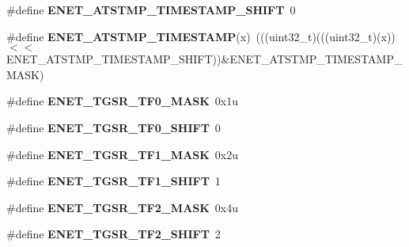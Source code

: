 \begin{DoxyCompactItemize}
\item 
\#define {\bfseries E\+N\+E\+T\+\_\+\+A\+T\+S\+T\+M\+P\+\_\+\+T\+I\+M\+E\+S\+T\+A\+M\+P\+\_\+\+S\+H\+I\+FT}~0\hypertarget{group__ENET__Register__Masks_ga32c08f5d3821f0f0ff1f40b4ec0de035}{}\label{group__ENET__Register__Masks_ga32c08f5d3821f0f0ff1f40b4ec0de035}

\item 
\#define {\bfseries E\+N\+E\+T\+\_\+\+A\+T\+S\+T\+M\+P\+\_\+\+T\+I\+M\+E\+S\+T\+A\+MP}(x)~(((uint32\+\_\+t)(((uint32\+\_\+t)(x))$<$$<$E\+N\+E\+T\+\_\+\+A\+T\+S\+T\+M\+P\+\_\+\+T\+I\+M\+E\+S\+T\+A\+M\+P\+\_\+\+S\+H\+I\+FT))\&E\+N\+E\+T\+\_\+\+A\+T\+S\+T\+M\+P\+\_\+\+T\+I\+M\+E\+S\+T\+A\+M\+P\+\_\+\+M\+A\+SK)\hypertarget{group__ENET__Register__Masks_gaddba4ddcc6f73e074fa2cfae50028ac9}{}\label{group__ENET__Register__Masks_gaddba4ddcc6f73e074fa2cfae50028ac9}

\item 
\#define {\bfseries E\+N\+E\+T\+\_\+\+T\+G\+S\+R\+\_\+\+T\+F0\+\_\+\+M\+A\+SK}~0x1u\hypertarget{group__ENET__Register__Masks_gac4b5286f5096d79e0c3a286ad49cf102}{}\label{group__ENET__Register__Masks_gac4b5286f5096d79e0c3a286ad49cf102}

\item 
\#define {\bfseries E\+N\+E\+T\+\_\+\+T\+G\+S\+R\+\_\+\+T\+F0\+\_\+\+S\+H\+I\+FT}~0\hypertarget{group__ENET__Register__Masks_ga636e49d8773de954ad946d32aa23eeb5}{}\label{group__ENET__Register__Masks_ga636e49d8773de954ad946d32aa23eeb5}

\item 
\#define {\bfseries E\+N\+E\+T\+\_\+\+T\+G\+S\+R\+\_\+\+T\+F1\+\_\+\+M\+A\+SK}~0x2u\hypertarget{group__ENET__Register__Masks_ga7cc2fdb7c10440f4ea4974b225588da0}{}\label{group__ENET__Register__Masks_ga7cc2fdb7c10440f4ea4974b225588da0}

\item 
\#define {\bfseries E\+N\+E\+T\+\_\+\+T\+G\+S\+R\+\_\+\+T\+F1\+\_\+\+S\+H\+I\+FT}~1\hypertarget{group__ENET__Register__Masks_ga05bf6e9ffee285ca3fb130b9c8948fa5}{}\label{group__ENET__Register__Masks_ga05bf6e9ffee285ca3fb130b9c8948fa5}

\item 
\#define {\bfseries E\+N\+E\+T\+\_\+\+T\+G\+S\+R\+\_\+\+T\+F2\+\_\+\+M\+A\+SK}~0x4u\hypertarget{group__ENET__Register__Masks_ga3bb5da9c3f3c88fc7784149aaf536e0c}{}\label{group__ENET__Register__Masks_ga3bb5da9c3f3c88fc7784149aaf536e0c}

\item 
\#define {\bfseries E\+N\+E\+T\+\_\+\+T\+G\+S\+R\+\_\+\+T\+F2\+\_\+\+S\+H\+I\+FT}~2\hypertarget{group__ENET__Register__Masks_ga8b692cdc1ae33167e75fc033385ea3f2}{}\label{group__ENET__Register__Masks_ga8b692cdc1ae33167e75fc033385ea3f2}


\end{DoxyCompactItemize}
